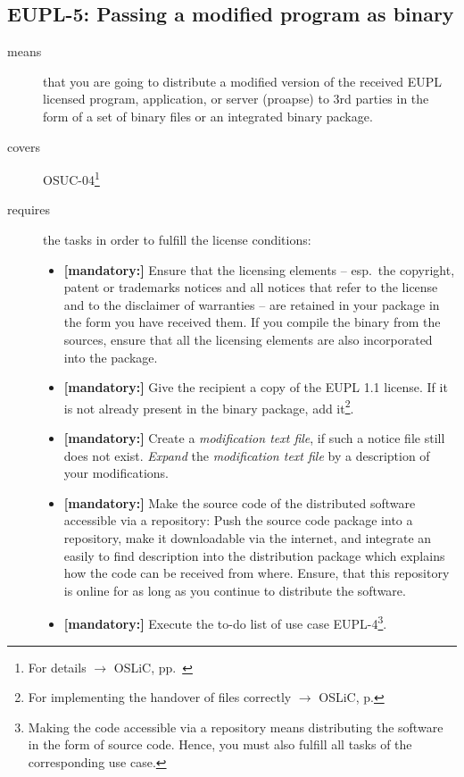 \subsection{EUPL-5: Passing a modified program as binary}

\begin{description}
\item[means] that you are going to distribute a modified version of the received
EUPL licensed pro\-gram, application, or server (proapse) to 3rd parties in
the form of a set of binary files or an integrated binary package.
\item[covers] OSUC-04\footnote{For details $\rightarrow$ OSLiC, pp.\ \pageref{OSUC-04-DEF}}
\item[requires] the tasks in order to fulfill the license conditions:
\begin{itemize}

  \item \textbf{[mandatory:]} Ensure that the licensing elements -- esp.\ the
  copyright, patent or trademarks notices and all notices that refer to the
  license and to the disclaimer of warranties -- are retained in your package in
  the form you have received them. If you compile the binary from the sources,
  ensure that all the licensing elements are also incorporated into the package.

 \item \textbf{[mandatory:]} Give the recipient a copy of the EUPL 1.1
  license. If it is not already present in the binary package, add
  it\footnote{For implementing the handover of files correctly $\rightarrow$
  OSLiC, p. \pageref{DistributingFilesHint}}.
  
  \item \textbf{[mandatory:]} Create a \emph{modification text file}, if such a
  notice file still does not exist. \emph{Expand} the \emph{modification text
  file} by a description of your modifications.

  \item \textbf{[mandatory:]} Make the source code of the distributed software
  accessible via a repository: Push the source code package into a repository,
  make it downloadable via the internet, and integrate an easily to find
  description into the distribution package which explains how the code can be
  received from where. Ensure, that this repository is online for as long as you
  continue to distribute the software.
    
  \item \textbf{[mandatory:]} Execute the to-do list of use case EUPL-4\footnote{
  Making the code accessible via a repository means distributing the software in
  the form of source code. Hence, you must also fulfill all tasks of the
  corresponding use case.}.
  

\end{itemize}
\end{description}
